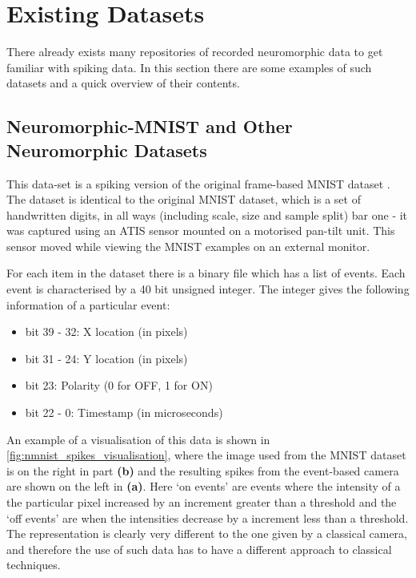\section{Existing Datasets}

There already exists many repositories of recorded neuromorphic data to get familiar with spiking data. In this section there are some examples of such datasets and a quick overview of their contents.

\subsection{Neuromorphic-MNIST and Other Neuromorphic Datasets}

This data-set is a spiking version of the original frame-based MNIST dataset \cite{MNIST}\cite{NMNIST}. The dataset is identical to the original MNIST dataset, which is a set of handwritten digits, in all ways (including scale, size and sample split) bar one - it was captured using an ATIS sensor mounted on a motorised pan-tilt unit. This sensor moved while viewing the MNIST examples on an external monitor.

For each item in the dataset there is a binary file which has a list of events. Each event is characterised by a 40 bit unsigned integer. The integer gives the following information of a particular event:

\begin{itemize}
      \item bit 39 - 32: X location (in pixels)
      \item bit 31 - 24: Y location (in pixels)
      \item bit 23: Polarity (0 for OFF, 1 for ON)
      \item bit 22 - 0: Timestamp (in microseconds)
\end{itemize}

An example of a visualisation of this data is shown in \autoref{fig:nmnist_spikes_visualisation}, where the image used from the MNIST dataset is on the right in part \textbf{(b)} and the resulting spikes from the event-based camera are shown on the left in \textbf{(a)}. Here `on events' are events where the intensity of a the particular pixel increased by an increment greater than a threshold and the `off events' are when the intensities decrease by a increment less than a threshold. The representation is clearly very different to the one given by a classical camera, and therefore the use of such data has to have a different approach to classical techniques.


